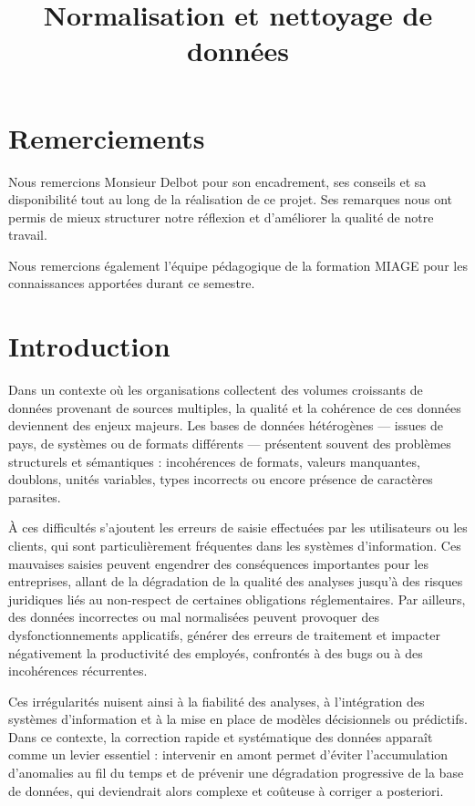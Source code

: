 \documentclass[a4paper, 12pt, twoside]{article}
\title{Normalisation et nettoyage de données}
\begin{document}
\pagedegarde
\section*{Remerciements}
Nous remercions Monsieur Delbot pour son encadrement, ses conseils et sa disponibilité tout au long de la réalisation de ce projet. Ses remarques nous ont permis de mieux structurer notre réflexion et d’améliorer la qualité de notre travail.

Nous remercions également l’équipe pédagogique de la formation MIAGE pour les connaissances apportées durant ce semestre.
\newpage

\tableofcontents
\newpage

\section{Introduction}
Dans un contexte où les organisations collectent des volumes croissants de données provenant de sources multiples, la qualité et la cohérence de ces données deviennent des enjeux majeurs. Les bases de données hétérogènes — issues de pays, de systèmes ou de formats différents — présentent souvent des problèmes structurels et sémantiques : incohérences de formats, valeurs manquantes, doublons, unités variables, types incorrects ou encore présence de caractères parasites.

À ces difficultés s’ajoutent les erreurs de saisie effectuées par les utilisateurs ou les clients, qui sont particulièrement fréquentes dans les systèmes d’information. Ces mauvaises saisies peuvent engendrer des conséquences importantes pour les entreprises, allant de la dégradation de la qualité des analyses jusqu’à des risques juridiques liés au non-respect de certaines obligations réglementaires. Par ailleurs, des données incorrectes ou mal normalisées peuvent provoquer des dysfonctionnements applicatifs, générer des erreurs de traitement et impacter négativement la productivité des employés, confrontés à des bugs ou à des incohérences récurrentes.

Ces irrégularités nuisent ainsi à la fiabilité des analyses, à l’intégration des systèmes d’information et à la mise en place de modèles décisionnels ou prédictifs. Dans ce contexte, la correction rapide et systématique des données apparaît comme un levier essentiel : intervenir en amont permet d’éviter l’accumulation d’anomalies au fil du temps et de prévenir une dégradation progressive de la base de données, qui deviendrait alors complexe et coûteuse à corriger a posteriori.
\end{document}
